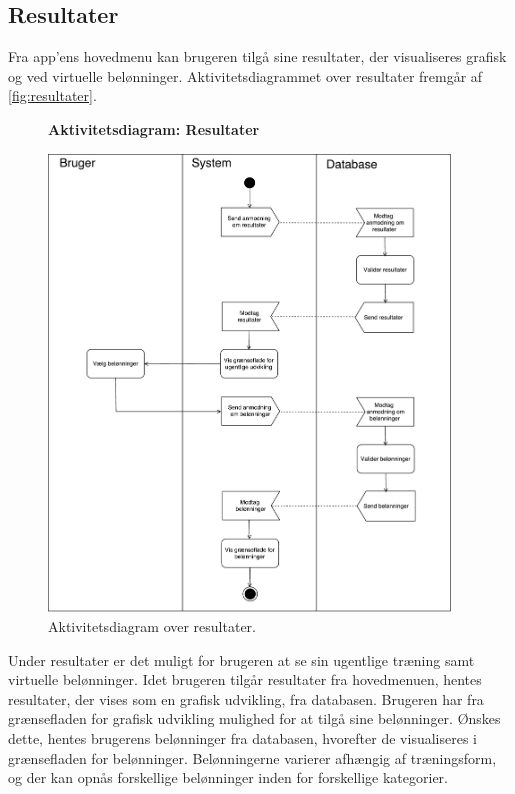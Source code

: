 \subsection*{Resultater}
Fra app'ens hovedmenu kan brugeren tilgå sine resultater, der visualiseres grafisk og ved virtuelle belønninger.
Aktivitetsdiagrammet over resultater fremgår af \autoref{fig:resultater}.

\begin{figure} [H]
\centering
\textbf{Aktivitetsdiagram: Resultater}\par\medskip
\includegraphics[width=0.95\textwidth]{figures/aktivitetsdiagram/Resultater}
\caption{Aktivitetsdiagram over resultater.}
\label{fig:resultater}
\end{figure}

\noindent
Under resultater er det muligt for brugeren at se sin ugentlige træning samt virtuelle belønninger. Idet brugeren tilgår resultater fra hovedmenuen, hentes resultater, der vises som en grafisk udvikling, fra databasen. Brugeren har fra grænsefladen for grafisk udvikling mulighed for at tilgå sine belønninger. Ønskes dette, hentes brugerens belønninger fra databasen, hvorefter de visualiseres i grænsefladen for belønninger. Belønningerne varierer afhængig af træningsform, og der kan opnås forskellige belønninger inden for forskellige kategorier. 

%
%
